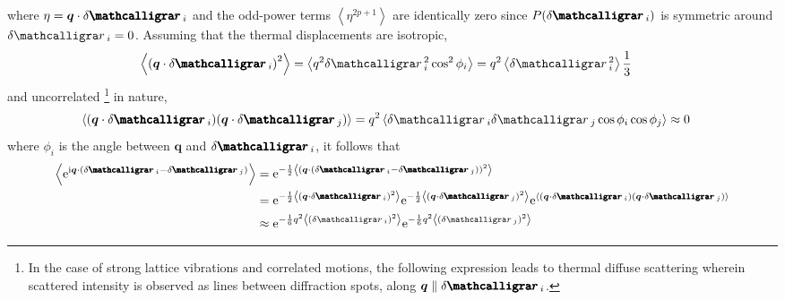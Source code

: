 %
where $\eta = \boldsymbol{q} \cdot \delta \bscriptr_i$ and
the odd-power terms $\left< \eta^{2 p + 1} \right> $ are identically zero
since $P(\delta \bscriptr_i)$ is symmetric around $\delta \scriptr_i = 0$.
Assuming that the thermal displacements are isotropic,
%
\begin{equation}
  \begin{aligned}
    \left< \left( \boldsymbol{q} \cdot \delta \bscriptr_i \right)^2 \right>
      & = \left< q^2 \delta \scriptr_i^2 \cos^2 \phi_i \right> = q^2 \left< \delta \scriptr_i^2 \right> \frac{1}{3}
  \end{aligned}
\end{equation}
%
and uncorrelated%
\footnote{In the case of strong lattice vibrations and correlated motions,
the following expression leads to thermal diffuse scattering
wherein scattered intensity is observed as lines between diffraction spots,
along $\boldsymbol{q} \parallel \delta \bscriptr_i$.} in nature,
%
\begin{equation}
  \begin{aligned}
     \left< ( \boldsymbol{q} \cdot \delta \bscriptr_i ) ( \boldsymbol{q} \cdot \delta \bscriptr_j) \right>
        & = q^2 \left< \delta \scriptr_i \delta \scriptr_j \cos \phi_i \cos \phi_j \right> \approx 0
  \end{aligned}
\end{equation}
%
where $\phi_i$ is the angle between $\boldsymbol{q}$ and $\delta \bscriptr_i$,
it follows that
%
\begin{equation}
  \begin{aligned}
    \left< \text{e}^{\text{i} \boldsymbol{q} \cdot (\delta \bscriptr_i - \delta \bscriptr_j)} \right>
      & = \text{e}^{-\frac{1}{2} \left< \left( \boldsymbol{q} \cdot (\delta \bscriptr_i - \delta \bscriptr_j) \right)^2 \right> } \\
      & = \text{e}^{-\frac{1}{2} \left< \left( \boldsymbol{q} \cdot \delta \bscriptr_i \right)^2 \right>}
          \text{e}^{-\frac{1}{2} \left< \left( \boldsymbol{q} \cdot \delta \bscriptr_j \right)^2 \right>}
          \text{e}^{\left< \left( \boldsymbol{q} \cdot \delta \bscriptr_i \right) \left( \boldsymbol{q} \cdot \delta \bscriptr_j \right) \right>} \\
      & \approx \text{e}^{-\frac{1}{6} q^2 \left< \left( \delta \scriptr_i \right)^2 \right>}
        \text{e}^{-\frac{1}{6} q^2 \left< \left( \delta \scriptr_j \right)^2 \right>}
  \end{aligned}
\end{equation}
%

